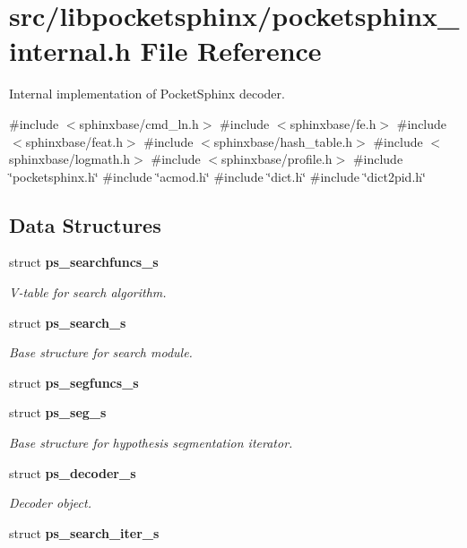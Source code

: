 \section{src/libpocketsphinx/pocketsphinx\+\_\+internal.h File Reference}
\label{pocketsphinx__internal_8h}


Internal implementation of Pocket\+Sphinx decoder.  


{\ttfamily \#include $<$sphinxbase/cmd\+\_\+ln.\+h$>$}\newline
{\ttfamily \#include $<$sphinxbase/fe.\+h$>$}\newline
{\ttfamily \#include $<$sphinxbase/feat.\+h$>$}\newline
{\ttfamily \#include $<$sphinxbase/hash\+\_\+table.\+h$>$}\newline
{\ttfamily \#include $<$sphinxbase/logmath.\+h$>$}\newline
{\ttfamily \#include $<$sphinxbase/profile.\+h$>$}\newline
{\ttfamily \#include \char`\"{}pocketsphinx.\+h\char`\"{}}\newline
{\ttfamily \#include \char`\"{}acmod.\+h\char`\"{}}\newline
{\ttfamily \#include \char`\"{}dict.\+h\char`\"{}}\newline
{\ttfamily \#include \char`\"{}dict2pid.\+h\char`\"{}}\newline
\subsection*{Data Structures}
\begin{DoxyCompactItemize}
\item 
struct \textbf{ ps\+\_\+searchfuncs\+\_\+s}
\begin{DoxyCompactList}\small\item\em V-\/table for search algorithm. \end{DoxyCompactList}\item 
struct \textbf{ ps\+\_\+search\+\_\+s}
\begin{DoxyCompactList}\small\item\em Base structure for search module. \end{DoxyCompactList}\item 
struct \textbf{ ps\+\_\+segfuncs\+\_\+s}
\item 
struct \textbf{ ps\+\_\+seg\+\_\+s}
\begin{DoxyCompactList}\small\item\em Base structure for hypothesis segmentation iterator. \end{DoxyCompactList}\item 
struct \textbf{ ps\+\_\+decoder\+\_\+s}
\begin{DoxyCompactList}\small\item\em Decoder object. \end{DoxyCompactList}\item 
struct \textbf{ ps\+\_\+search\+\_\+iter\+\_\+s}
\end{DoxyCompactItemize}
